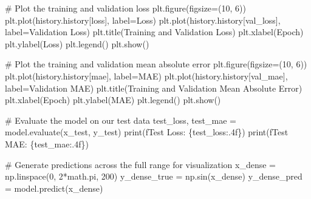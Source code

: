 \documentclass[
  9pt,
  letterpaper,
  abstract,
  titlepage]{scrbook}
\newenvironment{Shaded}{\begin{snugshade}}{\end{snugshade}}
\newcommand{\BuiltInTok}[1]{\textcolor[rgb]{0.00,0.23,0.31}{#1}}
\newcommand{\CommentTok}[1]{\textcolor[rgb]{0.37,0.37,0.37}{#1}}
\newcommand{\DecValTok}[1]{\textcolor[rgb]{0.68,0.00,0.00}{#1}}
\newcommand{\NormalTok}[1]{\textcolor[rgb]{0.00,0.23,0.31}{#1}}
\newcommand{\OperatorTok}[1]{\textcolor[rgb]{0.37,0.37,0.37}{#1}}
\newcommand{\SpecialCharTok}[1]{\textcolor[rgb]{0.37,0.37,0.37}{#1}}
\newcommand{\SpecialStringTok}[1]{\textcolor[rgb]{0.13,0.47,0.30}{#1}}
\newcommand{\StringTok}[1]{\textcolor[rgb]{0.13,0.47,0.30}{#1}}
\begin{document}
\begin{Shaded}
\begin{Highlighting}[]
\CommentTok{\# Plot the training and validation loss}
\NormalTok{plt.figure(figsize}\OperatorTok{=}\NormalTok{(}\DecValTok{10}\NormalTok{, }\DecValTok{6}\NormalTok{))}
\NormalTok{plt.plot(history.history[}\StringTok{\textquotesingle{}loss\textquotesingle{}}\NormalTok{], label}\OperatorTok{=}\StringTok{\textquotesingle{}Loss\textquotesingle{}}\NormalTok{)}
\NormalTok{plt.plot(history.history[}\StringTok{\textquotesingle{}val\_loss\textquotesingle{}}\NormalTok{], label}\OperatorTok{=}\StringTok{\textquotesingle{}Validation Loss\textquotesingle{}}\NormalTok{)}
\NormalTok{plt.title(}\StringTok{\textquotesingle{}Training and Validation Loss\textquotesingle{}}\NormalTok{)}
\NormalTok{plt.xlabel(}\StringTok{\textquotesingle{}Epoch\textquotesingle{}}\NormalTok{)}
\NormalTok{plt.ylabel(}\StringTok{\textquotesingle{}Loss\textquotesingle{}}\NormalTok{)}
\NormalTok{plt.legend()}
\NormalTok{plt.show()}

\CommentTok{\# Plot the training and validation mean absolute error}
\NormalTok{plt.figure(figsize}\OperatorTok{=}\NormalTok{(}\DecValTok{10}\NormalTok{, }\DecValTok{6}\NormalTok{))}
\NormalTok{plt.plot(history.history[}\StringTok{\textquotesingle{}mae\textquotesingle{}}\NormalTok{], label}\OperatorTok{=}\StringTok{\textquotesingle{}MAE\textquotesingle{}}\NormalTok{)}
\NormalTok{plt.plot(history.history[}\StringTok{\textquotesingle{}val\_mae\textquotesingle{}}\NormalTok{], label}\OperatorTok{=}\StringTok{\textquotesingle{}Validation MAE\textquotesingle{}}\NormalTok{)}
\NormalTok{plt.title(}\StringTok{\textquotesingle{}Training and Validation Mean Absolute Error\textquotesingle{}}\NormalTok{)}
\NormalTok{plt.xlabel(}\StringTok{\textquotesingle{}Epoch\textquotesingle{}}\NormalTok{)}
\NormalTok{plt.ylabel(}\StringTok{\textquotesingle{}MAE\textquotesingle{}}\NormalTok{)}
\NormalTok{plt.legend()}
\NormalTok{plt.show()}

\CommentTok{\# Evaluate the model on our test data}
\NormalTok{test\_loss, test\_mae }\OperatorTok{=}\NormalTok{ model.evaluate(x\_test, y\_test)}
\BuiltInTok{print}\NormalTok{(}\SpecialStringTok{f\textquotesingle{}Test Loss: }\SpecialCharTok{\{}\NormalTok{test\_loss}\SpecialCharTok{:.4f\}}\SpecialStringTok{\textquotesingle{}}\NormalTok{)}
\BuiltInTok{print}\NormalTok{(}\SpecialStringTok{f\textquotesingle{}Test MAE: }\SpecialCharTok{\{}\NormalTok{test\_mae}\SpecialCharTok{:.4f\}}\SpecialStringTok{\textquotesingle{}}\NormalTok{)}

\CommentTok{\# Generate predictions across the full range for visualization}
\NormalTok{x\_dense }\OperatorTok{=}\NormalTok{ np.linspace(}\DecValTok{0}\NormalTok{, }\DecValTok{2}\OperatorTok{*}\NormalTok{math.pi, }\DecValTok{200}\NormalTok{)}
\NormalTok{y\_dense\_true }\OperatorTok{=}\NormalTok{ np.sin(x\_dense)}
\NormalTok{y\_dense\_pred }\OperatorTok{=}\NormalTok{ model.predict(x\_dense)}


\end{Highlighting}
\end{Shaded}
\end{document}
